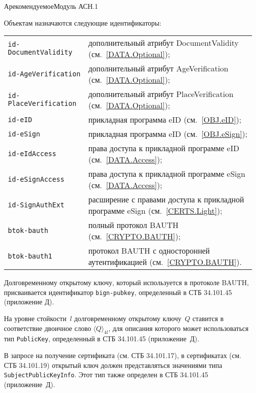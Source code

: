 \begin{appendix}{А}{рекомендуемое}{Модуль АСН.1}
\label{ASN}

\mbox{}


Объектам назначаются следующие идентификаторы:
\begin{center}
\begin{tabular}{p{4.5cm}p{11.5cm}}
\verb|id-DocumentValidity| &
дополнительный атрибут DocumentValidity (см.~\ref{DATA.Optional});\\
%
\verb|id-AgeVerification| &
дополнительный атрибут AgeVerification (см.~\ref{DATA.Optional});\\
%
\verb|id-PlaceVerification| &
дополнительный атрибут PlaceVerification (см.~\ref{DATA.Optional});\\
%
\verb|id-eID| &
прикладная программа eID (см.~\ref{OBJ.eID});\\
%
\verb|id-eSign| &
прикладная программа eID (см.~\ref{OBJ.eSign});\\
%
\verb|id-eIdAccess| &
права доступа к прикладной программе eID 
(см.~\ref{DATA.Access});\\
%
\verb|id-eSignAccess| &
права доступа к прикладной программе eSign 
(см.~\ref{DATA.Access});\\
%
\verb|id-SignAuthExt| &
расширение с правами доступа к прикладной программе eSign 
(см.~\ref{CERTS.Light});\\
%
\verb|btok-bauth| &
полный протокол BAUTH 
(см.~\ref{CRYPTO.BAUTH});\\
%
\verb|btok-bauth1| &
протокол BAUTH с односторонней аутентификацией
(см.~\ref{CRYPTO.BAUTH}).\\
\end{tabular}
\end{center}

Долговременному открытому ключу, который используется в протоколе 
BAUTH, присваивается идентификатор \verb|bign-pubkey|, определенный в СТБ 
34.101.45 (приложение Д).


На уровне стойкости~$l$ долговременному открытому ключу~$Q$ ставится в 
соответствие двоичное слово $\langle Q\rangle_{4l}$, для описания которого может 
использоваться тип \verb|PublicKey|, определенный в СТБ 34.101.45 (приложение~Д). 

В запросе на получение сертификата (см. СТБ 34.101.17), в сертификатах (см. СТБ 
34.101.19) открытый ключ должен представляться значениями типа 
\verb|SubjectPublicKeyInfo|. Этот тип также определен в СТБ 34.101.45 
(приложение~Д). 


\end{appendix}
